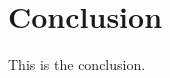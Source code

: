 \documentclass[main.tex]{subfiles}
\begin{document}
\section{Conclusion}\label{sec:conclusions}
This is the conclusion.
\end{document}
